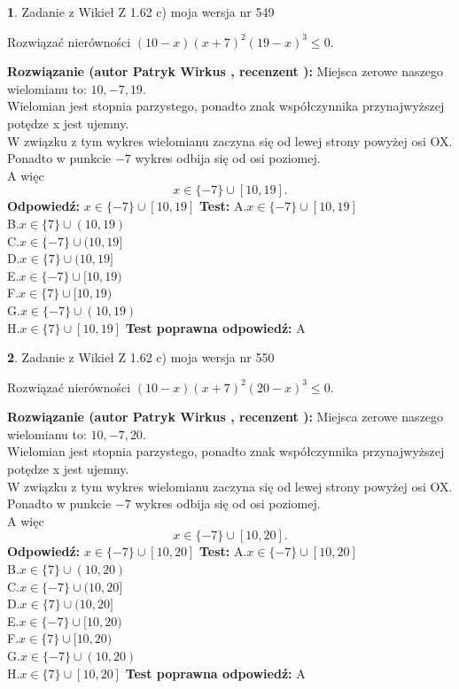 \documentclass[12pt, a4paper]{article}
\theoremstyle{definition} %
\newtheorem{zad}{}
\newcommand{\zadStart}[1]{\begin{zad}#1\newline}
\newcommand{\zadStop}{\end{zad}}
\newcommand{\rozwStart}[2]{\noindent \textbf{Rozwiązanie (autor #1 , recenzent #2): }\newline}
\newcommand{\rozwStop}{\newline}
\newcommand{\odpStart}{\noindent \textbf{Odpowiedź:}\newline}
\newcommand{\odpStop}{\newline}
\newcommand{\testStart}{\noindent \textbf{Test:}\newline}
\newcommand{\testStop}{\newline}
\newcommand{\kluczStart}{\noindent \textbf{Test poprawna odpowiedź:}\newline}
\newcommand{\kluczStop}{\newline}
\begin{document}
\zadStart{Zadanie z Wikieł Z 1.62 c) moja wersja nr 549}

Rozwiązać nierówności $(10-x)(x+7)^{2}(19-x)^{3}\le0$.
\zadStop
\rozwStart{Patryk Wirkus}{}
Miejsca zerowe naszego wielomianu to: $10, -7, 19$.\\
Wielomian jest stopnia parzystego, ponadto znak współczynnika przy\linebreak najwyższej potędze x jest ujemny.\\ W związku z tym wykres wielomianu zaczyna się od lewej strony powyżej osi OX.\\
Ponadto w punkcie $-7$ wykres odbija się od osi poziomej.\\
A więc $$x \in \{-7\} \cup [10,19].$$
\rozwStop
\odpStart
$x \in \{-7\} \cup [10,19]$
\odpStop
\testStart
A.$x \in \{-7\} \cup [10,19]$\\
B.$x \in \{7\} \cup (10,19)$\\
C.$x \in \{-7\} \cup (10,19]$\\
D.$x \in \{7\} \cup (10,19]$\\
E.$x \in \{-7\} \cup [10,19)$\\
F.$x \in \{7\} \cup [10,19)$\\
G.$x \in \{-7\} \cup (10,19)$\\
H.$x \in \{7\} \cup [10,19]$
\testStop
\kluczStart
A
\kluczStop



\zadStart{Zadanie z Wikieł Z 1.62 c) moja wersja nr 550}

Rozwiązać nierówności $(10-x)(x+7)^{2}(20-x)^{3}\le0$.
\zadStop
\rozwStart{Patryk Wirkus}{}
Miejsca zerowe naszego wielomianu to: $10, -7, 20$.\\
Wielomian jest stopnia parzystego, ponadto znak współczynnika przy\linebreak najwyższej potędze x jest ujemny.\\ W związku z tym wykres wielomianu zaczyna się od lewej strony powyżej osi OX.\\
Ponadto w punkcie $-7$ wykres odbija się od osi poziomej.\\
A więc $$x \in \{-7\} \cup [10,20].$$
\rozwStop
\odpStart
$x \in \{-7\} \cup [10,20]$
\odpStop
\testStart
A.$x \in \{-7\} \cup [10,20]$\\
B.$x \in \{7\} \cup (10,20)$\\
C.$x \in \{-7\} \cup (10,20]$\\
D.$x \in \{7\} \cup (10,20]$\\
E.$x \in \{-7\} \cup [10,20)$\\
F.$x \in \{7\} \cup [10,20)$\\
G.$x \in \{-7\} \cup (10,20)$\\
H.$x \in \{7\} \cup [10,20]$
\testStop
\kluczStart
A
\kluczStop
\end{document}
